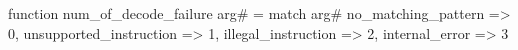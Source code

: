 function num_of_decode_failure arg# = match arg# {
  no_matching_pattern => 0,
  unsupported_instruction => 1,
  illegal_instruction => 2,
  internal_error => 3
}

